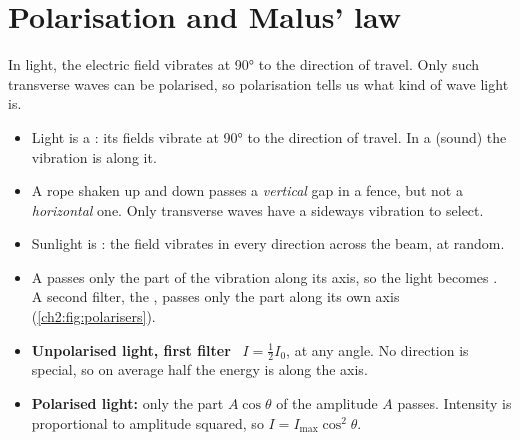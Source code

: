 \section{Polarisation and Malus' law}\label{ch2:sec:polarisation}

\begin{bigidea}
In light, the electric field vibrates at \ang{90} to the direction of travel. Only such
transverse waves can be polarised, so polarisation tells us what kind of wave light is.
\end{bigidea}

\begin{keywords}
\end{keywords}

\begin{itemize}
  \item Light is a : its fields vibrate at \ang{90} to the direction
        of travel. In a  (sound) the vibration is along it.
  \item A rope shaken up and down passes a \emph{vertical} gap in a fence, but not a
        \emph{horizontal} one. Only transverse waves have a sideways vibration to select.
  \item Sunlight is : the field vibrates in every direction across the
        beam, at random.
  \item A  passes only the part of the vibration along its axis, so the
        light becomes . A second filter, the , passes
        only the part along its own axis (\cref{ch2:fig:polarisers}).
  \item \textbf{Unpolarised light, first filter} \hscbadgenotonsheet\ $I = \tfrac{1}{2}I_0$,
        at any angle. No direction is special, so on average half the energy is along the axis.
  \item \textbf{Polarised light:} only the part $A\cos\theta$ of the amplitude $A$ passes.
        Intensity is proportional to amplitude squared, so $I = I_\mathrm{max}\cos^2\theta$.
\end{itemize}

